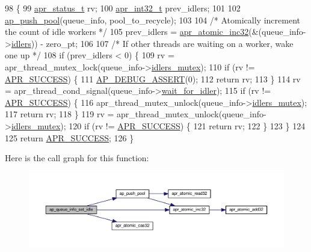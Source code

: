 \begin{DoxyCode}
98 \{
99     \hyperlink{group__apr__errno_gaa5105fa83cc322f09382292db8b47593}{apr\_status\_t} rv;
100     \hyperlink{group__apr__platform_ga21ef1e35fd3ff9be386f3cb20164ff02}{apr\_int32\_t} prev\_idlers;
101 
102     \hyperlink{group__APACHE__MPM__EVENT_ga725f2a86b43ff2ade34db77aec45e471}{ap\_push\_pool}(queue\_info, pool\_to\_recycle);
103 
104     \textcolor{comment}{/* Atomically increment the count of idle workers */}
105     prev\_idlers = \hyperlink{atomic_8c_a4af33da5aa6493ec321af14bedfc47a9}{apr\_atomic\_inc32}(&(queue\_info->\hyperlink{structfd__queue__info__t_a34f88b2125fb629dd4200cf75568bb1d}{idlers})) - zero\_pt;
106 
107     \textcolor{comment}{/* If other threads are waiting on a worker, wake one up */}
108     \textcolor{keywordflow}{if} (prev\_idlers < 0) \{
109         rv = apr\_thread\_mutex\_lock(queue\_info->\hyperlink{structfd__queue__info__t_a18d58b9d46ec7629daee1c309161b8d0}{idlers\_mutex});
110         \textcolor{keywordflow}{if} (rv != \hyperlink{group__apr__errno_ga9ee311b7bf1c691dc521d721339ee2a6}{APR\_SUCCESS}) \{
111             \hyperlink{group__APACHE__CORE__DAEMON_ga85dbc1e4d9600422461f815193f8ace8}{AP\_DEBUG\_ASSERT}(0);
112             \textcolor{keywordflow}{return} rv;
113         \}
114         rv = apr\_thread\_cond\_signal(queue\_info->\hyperlink{structfd__queue__info__t_ab55cf55999e66ef49df240ec7ac1b750}{wait\_for\_idler});
115         \textcolor{keywordflow}{if} (rv != \hyperlink{group__apr__errno_ga9ee311b7bf1c691dc521d721339ee2a6}{APR\_SUCCESS}) \{
116             apr\_thread\_mutex\_unlock(queue\_info->\hyperlink{structfd__queue__info__t_a18d58b9d46ec7629daee1c309161b8d0}{idlers\_mutex});
117             \textcolor{keywordflow}{return} rv;
118         \}
119         rv = apr\_thread\_mutex\_unlock(queue\_info->\hyperlink{structfd__queue__info__t_a18d58b9d46ec7629daee1c309161b8d0}{idlers\_mutex});
120         \textcolor{keywordflow}{if} (rv != \hyperlink{group__apr__errno_ga9ee311b7bf1c691dc521d721339ee2a6}{APR\_SUCCESS}) \{
121             \textcolor{keywordflow}{return} rv;
122         \}
123     \}
124 
125     \textcolor{keywordflow}{return} \hyperlink{group__apr__errno_ga9ee311b7bf1c691dc521d721339ee2a6}{APR\_SUCCESS};
126 \}
\end{DoxyCode}


Here is the call graph for this function\+:
\nopagebreak
\begin{figure}[H]
\begin{center}
\leavevmode
\includegraphics[width=350pt]{group__APACHE__MPM__WORKER_ga7673a5c9eda89916d6df264fdfdba2b5_cgraph}
\end{center}
\end{figure}




